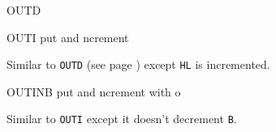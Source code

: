 \begin{basedescript}{
    \desclabelstyle{\multilinelabel}
    \desclabelwidth{3cm}}
\begin{DetailItem}{OUTD}
        \begin{DetailEffects}
            \FlagsOUTD
        \end{DetailEffects}
				
        \begin{DetailTiming}
        \end{DetailTiming}

    \end{DetailItem}

    \pagebreak
    \label{DetailRefOUTI}
    \begin{DetailItem}{OUTI}
        {put and ncrement}
        {\SymOUTI}

        Similar to {\tt OUTD} (see page \pageref{DetailRefOUTD}) except {\tt HL} is incremented.
		
        \begin{DetailEffects}
            \FlagsOUTI
        \end{DetailEffects}
				
        \begin{DetailTiming}
        \end{DetailTiming}

    \end{DetailItem}

    \begin{DetailItem}{OUTINB\ZXN}
        {put and ncrement with o }
        {\SymOUTINB}

        Similar to {\tt OUTI} except it doesn't decrement {\tt B}.

        \begin{DetailEffects}
            \FlagsOUTINB
        \end{DetailEffects}
				
        \begin{DetailTiming}
        \end{DetailTiming}


\end{DetailItem}
\end{basedescript}
